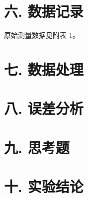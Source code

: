 \documentclass[12pt,a4paper]{article}
\begin{document}
	\section*{\textbf{{六. 数据记录}}}
	
	原始测量数据见附表 1。

	\section*{\textbf{{七. 数据处理}}}
	
	\section*{\textbf{八. 误差分析}}

	\section*{\textbf{九. 思考题}}
	
	\section*{\textbf{{十. 实验结论}}}
\end{document}
